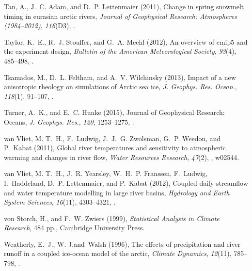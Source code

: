 \documentclass[jgrga, draft]{agutex}
\begin{document}
\begin{article}
\begin{thebibliography}{79}
Tan, A., J.~C. Adam, and D.~P. Lettenmaier (2011), Change in spring snowmelt
  timing in eurasian arctic rivers, \textit{Journal of Geophysical Research:
  Atmospheres (1984--2012)}, \textit{116}(D3), .

Taylor, K.~E., R.~J. Stouffer, and G.~A. Meehl (2012), An overview of cmip5 and
  the experiment design, \textit{Bulletin of the American Meteorological
  Society}, \textit{93}(4), 485--498, .

Tsamados, M., D.~L. Feltham, and A.~V. Wilchinsky (2013), {Impact of a new
  anisotropic rheology on simulations of Arctic sea ice}, \textit{J. Geophys.
  Res. Ocean.}, \textit{118}(1), 91--107, .

Turner, A.~K., and E.~C. Hunke (2015), {Journal of Geophysical Research:
  Oceans}, \textit{J. Geophys. Res.}, \textit{120}, 1253--1275,
  .

van Vliet, M. T.~H., F.~Ludwig, J.~J.~G. Zwolsman, G.~P. Weedon, and P.~Kabat
  (2011), Global river temperatures and sensitivity to atmospheric warming and
  changes in river flow, \textit{Water Resources Research}, \textit{47}(2),
  , w02544.

van Vliet, M. T.~H., J.~R. Yearsley, W.~H.~P. Franssen, F.~Ludwig,
  I.~Haddeland, D.~P. Lettenmaier, and P.~Kabat (2012), Coupled daily
  streamflow and water temperature modelling in large river basins,
  \textit{Hydrology and Earth System Sciences}, \textit{16}(11), 4303--4321,
  .

von Storch, H., and F.~W. Zwiers (1999), \textit{{Statistical Analysis in
  Climate Research}}, 484 pp., Cambridge University Press.

Weatherly, E.~J., W. J.and~Walsh (1996), The effects of precipitation and river
  runoff in a coupled ice-ocean model of the arctic, \textit{Climate Dynamics},
  \textit{12}(11), 785--798, .


\end{thebibliography}
\end{article}
\end{document}

